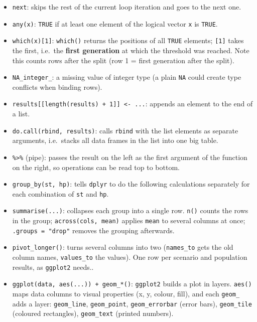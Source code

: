 \documentclass[
]{article}
\begin{document}
\begin{itemize}
  attempts are needed to get enough valid runs.
\item
  \texttt{next}: skips the rest of the current loop iteration and goes
  to the next one.
\item
  \texttt{any(x)}: \texttt{TRUE} if at least one element of the logical
  vector \texttt{x} is \texttt{TRUE}.
\item
  \texttt{which(x){[}1{]}}: \texttt{which()} returns the positions of
  all \texttt{TRUE} elements; \texttt{{[}1{]}} takes the first, i.e.~the
  \textbf{first generation} at which the threshold was reached. Note
  this counts rows after the split (row 1 = first generation after the
  split).
\item
  \texttt{NA\_integer\_}: a missing value of integer type (a plain
  \texttt{NA} could create type conflicts when binding rows).
\item
  \texttt{results{[}{[}length(results)\ +\ 1{]}{]}\ \textless{}-\ ...}:
  appends an element to the end of a list.
\item
  \texttt{do.call(rbind,\ results)}: calls \texttt{rbind} with the list
  elements as separate arguments, i.e.~stacks all data frames in the
  list into one big table.
\item
  \texttt{\%\textgreater{}\%} (pipe): passes the result on the left as
  the first argument of the function on the right, so operations can be
  read top to bottom.
\item
  \texttt{group\_by(st,\ hp)}: tells \texttt{dplyr} to do the following
  calculations separately for each combination of \texttt{st} and
  \texttt{hp}.
\item
  \texttt{summarise(...)}: collapses each group into a single row.
  \texttt{n()} counts the rows in the group;
  \texttt{across(cols,\ mean)} applies \texttt{mean} to several columns
  at once; \texttt{.groups\ =\ "drop"} removes the grouping afterwards.
\item
  \texttt{pivot\_longer()}: turns several columns into two
  (\texttt{names\_to} gets the old column names, \texttt{values\_to} the
  values). One row per scenario and population results, as
  \texttt{ggplot2} needs..
\item
  \texttt{ggplot(data,\ aes(...))\ +\ geom\_*()}: \texttt{ggplot2}
  builds a plot in layers. \texttt{aes()} maps data columns to visual
  properties (x, y, colour, fill), and each \texttt{geom\_} adds a
  layer: \texttt{geom\_line}, \texttt{geom\_point},
  \texttt{geom\_errorbar} (error bars), \texttt{geom\_tile} (coloured
  rectangles), \texttt{geom\_text} (printed numbers).

\end{itemize}
\end{document}
